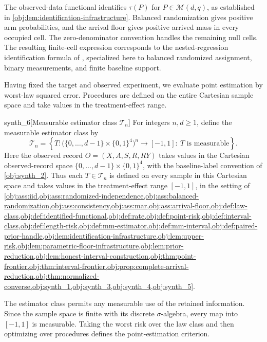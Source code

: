 \documentclass[11pt]{article}
\begin{document}
The observed-data functional  identifies \(\tau(P)\) for \(P\in\mathcal M(d,q)\), as established in \cref{obj:lem:identification-infrastructure}. Balanced randomization gives positive arm probabilities, and the arrival floor gives positive arrived mass in every occupied cell. The zero-denominator convention handles the remaining null cells. The resulting finite-cell expression corresponds to the nested-regression identification formula of \href{https://academic.oup.com/jrsssb/article/87/2/480/7829031}{\citet[Lemma~1.1, equation~(10), under Assumptions~1--3]{KallusMao2025}}, specialized here to balanced randomized assignment, binary measurements, and finite baseline support.

Having fixed the target and observed experiment, we evaluate point estimation by worst-law squared error. Procedures are defined on the entire Cartesian sample space and take values in the treatment-effect range.

\begin{definitionv}{synth_6}[Measurable estimator class $\mathcal T_n$]
For integers \(n,d\ge1\), define the measurable estimator class by
\[
\mathcal T_n
=
\left\{
T:\bigl(\{0,\ldots,d-1\}\times\{0,1\}^4\bigr)^n
\longrightarrow[-1,1]
:\ T\text{ is measurable}
\right\}.
\]
Here the observed record \(O=(X,A,S,R,RY)\) takes values in the Cartesian observed-record space \(\{0,\ldots,d-1\}\times\{0,1\}^4\), with the baseline-label convention of \cref{obj:synth_2}. Thus each \(T\in\mathcal T_n\) is defined on every sample in this Cartesian space and takes values in the treatment-effect range \([-1,1]\), in the setting of \cref{obj:ass:iid,obj:ass:randomized-independence,obj:ass:balanced-randomization,obj:ass:consistency,obj:ass:mar,obj:ass:arrival-floor,obj:def:law-class,obj:def:identified-functional,obj:def:rate,obj:def:point-risk,obj:def:interval-class,obj:def:length-risk,obj:def:mm-estimator,obj:def:mm-interval,obj:def:paired-prior-handle,obj:lem:identification-infrastructure,obj:lem:upper-risk,obj:lem:parametric-floor-infrastructure,obj:lem:prior-reduction,obj:lem:honest-interval-construction,obj:thm:point-frontier,obj:thm:interval-frontier,obj:prop:complete-arrival-reduction,obj:thm:normalized-converse,obj:synth_1,obj:synth_3,obj:synth_4,obj:synth_5}.
\end{definitionv}

The estimator class  permits any measurable use of the retained information. Since the sample space is finite with its discrete \(\sigma\)-algebra, every map into \([-1,1]\) is measurable. Taking the worst risk over the law class and then optimizing over procedures defines the point-estimation criterion.
\end{document}
